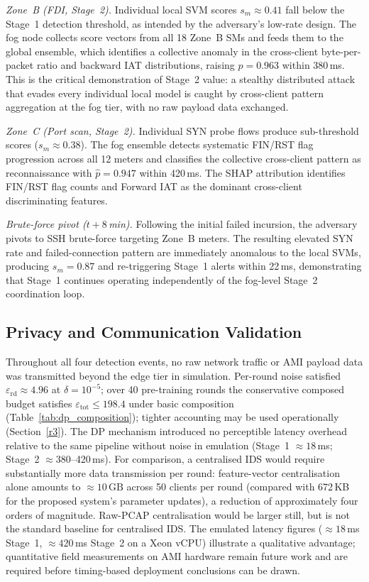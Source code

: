 \documentclass[sensors,article,submit,pdftex,moreauthors]{Definitions/mdpi}
\begin{document}
\noindent\textit{Zone~B (FDI, Stage~2).} Individual local SVM scores $s_m{\approx}0.41$ fall below the Stage~1 detection threshold, as intended by the adversary's low-rate design. The fog node collects score vectors from all 18 Zone~B SMs and feeds them to the global ensemble, which identifies a collective anomaly in the cross-client byte-per-packet ratio and backward IAT distributions, raising $\hat{p}{=}0.963$ within 380\,ms. This is the critical demonstration of Stage~2 value: a stealthy distributed attack that evades every individual local model is caught by cross-client pattern aggregation at the fog tier, with no raw payload data exchanged.

\noindent\textit{Zone~C (Port scan, Stage~2).} Individual SYN probe flows produce sub-threshold scores ($s_m{\approx}0.38$). The fog ensemble detects systematic FIN/RST flag progression across all 12 meters and classifies the collective cross-client pattern as reconnaissance with $\hat{p}{=}0.947$ within 420\,ms. The SHAP attribution identifies FIN/RST flag counts and Forward IAT as the dominant cross-client discriminating features.

\noindent\textit{Brute-force pivot ($t{+}8$\,min).} Following the initial failed incursion, the adversary pivots to SSH brute-force targeting Zone~B meters. The resulting elevated SYN rate and failed-connection pattern are immediately anomalous to the local SVMs, producing $s_m{=}0.87$ and re-triggering Stage~1 alerts within 22\,ms, demonstrating that Stage~1 continues operating independently of the fog-level Stage~2 coordination loop.

\subsection{Privacy and Communication Validation}

Throughout all four detection events, no raw network traffic or AMI payload data was transmitted beyond the edge tier in simulation. Per-round noise satisfied $\varepsilon_{\mathrm{rd}}{\approx}4.96$ at $\delta{=}10^{-5}$; over 40 pre-training rounds the conservative composed budget satisfies $\varepsilon_{\mathrm{tot}}{\leq}198.4$ under basic composition (Table~\ref{tab:dp_composition}); tighter accounting may be used operationally (Section~\ref{r3}). The DP mechanism introduced no perceptible latency overhead relative to the same pipeline without noise in emulation (Stage~1 ${\approx}18$\,ms; Stage~2 ${\approx}380$--420\,ms). For comparison, a centralised IDS would require substantially more data transmission per round: feature-vector centralisation alone amounts to ${\approx}10\,\mathrm{GB}$ across 50 clients per round (compared with 672\,KB for the proposed system's parameter updates), a reduction of approximately four orders of magnitude. Raw-PCAP centralisation would be larger still, but is not the standard baseline for centralised IDS. The emulated latency figures (${\approx}18$\,ms Stage~1, ${\approx}420$\,ms Stage~2 on a Xeon vCPU) illustrate a qualitative advantage; quantitative field measurements on AMI hardware remain future work and are required before timing-based deployment conclusions can be drawn.
\end{document}
